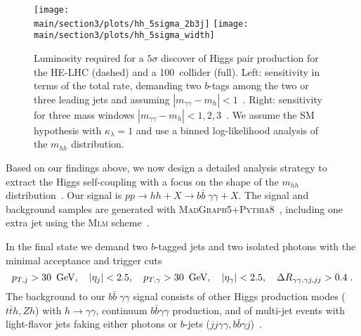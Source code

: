 \begin{figure*}[b!]
\centering 
 \texttt{[image: \\main/section3/plots/hh\_5sigma\_2b3j]} 
 \texttt{[image: \\main/section3/plots/hh\_5sigma\_width]}
   \caption{Luminosity required for a $5\sigma$ discover of Higgs pair
     production for the HE-LHC (dashed) and a 100~\UTeV collider (full).
     Left: sensitivity in terms of the total rate, demanding two
     $b$-tags among the two or three leading jets and assuming
     $|m_{\gamma\gamma}-m_h|<1$~\UGeV.  Right: sensitivity for three
     mass windows $|m_{\gamma\gamma}-m_h|<1,2,3$~\UGeV.  We assume the
     SM hypothesis with $\kappa_\lambda=1$ and use a binned
     log-likelihood analysis of the $m_{hh}$ distribution.}
 \label{fig:bound1}
\end{figure*}

Based on our findings above, we now design a detailed analysis strategy to extract the Higgs
self-coupling with a focus on the shape of the $m_{hh}$
distribution~\cite{Goncalves:2018yva}. Our signal is $pp \to hh + X \to b\bar{b} \; \gamma \gamma + X$.
The signal and background samples are generated with
\textsc{MadGraph5}+\textsc{Pythia8}~\cite{Alwall:2011uj, Alwall:2014hca,Sjostrand:2007gs}, including one
extra jet using the \textsc{Mlm} scheme~\cite{Mangano2002}.\medskip

In the final state we demand two $b$-tagged jets and
two isolated photons with the minimal acceptance and trigger cuts
%
\begin{equation}
p_{T,j}>30~\,\text{Ge\hspace{-.08em}V} , \quad  
|\eta_j |<2.5, \quad 
p_{T,\gamma}>30~\,\text{Ge\hspace{-.08em}V}, \quad  
|\eta_\gamma| <2.5 , \quad 
\Delta R_{\gamma \gamma, \gamma j, jj} >0.4 \; .
\label{eq:base_selections}
\end{equation}
%
The background to our $b\bar{b} \; \gamma \gamma$ signal consists of
other Higgs production modes ($t\bar{t}h, Zh$) with $h \to \gamma
\gamma$, continuum $b\bar{b}\gamma\gamma$ production, and of multi-jet
events with light-flavor jets faking either photons or $b$-jets
($jj\gamma\gamma, b\bar{b}\gamma j$)~\cite{Baur:2003gp}.  

